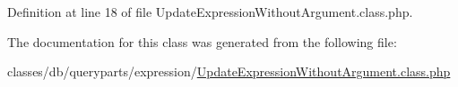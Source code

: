 Definition at line 18 of file Update\+Expression\+Without\+Argument.\+class.\+php.



The documentation for this class was generated from the following file\+:\begin{DoxyCompactItemize}
\item 
classes/db/queryparts/expression/\hyperlink{UpdateExpressionWithoutArgument_8class_8php}{Update\+Expression\+Without\+Argument.\+class.\+php}\end{DoxyCompactItemize}
